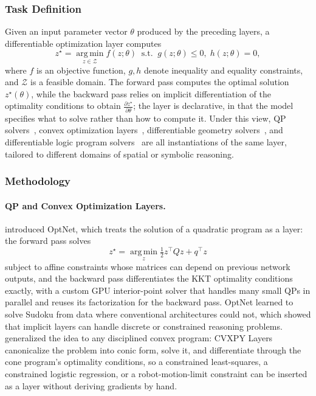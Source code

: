 \subsubsection{Task Definition}
Given an input parameter vector $\theta$ produced by the preceding layers, a differentiable optimization layer computes
\begin{equation}
    z^\star = \operatorname*{arg\,min}_{z \in \mathcal{Z}} f(z; \theta) \;\; \text{s.t.}\;\; g(z;\theta) \leq 0, \; h(z;\theta) = 0,
\end{equation}
where $f$ is an objective function, $g,h$ denote inequality and equality constraints, and $\mathcal{Z}$ is a feasible domain.
The forward pass computes the optimal solution $z^\star(\theta)$, while the backward pass relies on implicit differentiation of the optimality conditions to obtain $\tfrac{\partial z^\star}{\partial \theta}$; the layer is declarative, in that the model specifies what to solve rather than how to compute it.
Under this view, QP solvers~\cite{amos2017optnet}, convex optimization layers~\cite{agrawal2019differentiable}, differentiable geometry solvers~\cite{teed2021droid}, and differentiable logic program solvers~\cite{wang2019satnet,shindo2024learning} are all instantiations of the same layer, tailored to different domains of spatial or symbolic reasoning.


\subsubsection{Methodology}

\paragraph{QP and Convex Optimization Layers.}
\citet{amos2017optnet} introduced OptNet, which treats the solution of a quadratic program as a layer: the forward pass solves
\begin{equation*}
    z^\star = \operatorname*{arg\,min}_z \tfrac{1}{2} z^{\top} Q z + q^{\top} z
\end{equation*}
subject to affine constraints whose matrices can depend on previous network outputs, and the backward pass differentiates the KKT optimality conditions exactly, with a custom GPU interior-point solver that handles many small QPs in parallel and reuses its factorization for the backward pass.
OptNet learned to solve Sudoku from data where conventional architectures could not, which showed that implicit layers can handle discrete or constrained reasoning problems.
\citet{agrawal2019differentiable} generalized the idea to any disciplined convex program: CVXPY Layers~\cite{diamond2016cvxpy} canonicalize the problem into conic form, solve it, and differentiate through the cone program's optimality conditions, so a constrained least-squares, a constrained logistic regression, or a robot-motion-limit constraint can be inserted as a layer without deriving gradients by hand.

